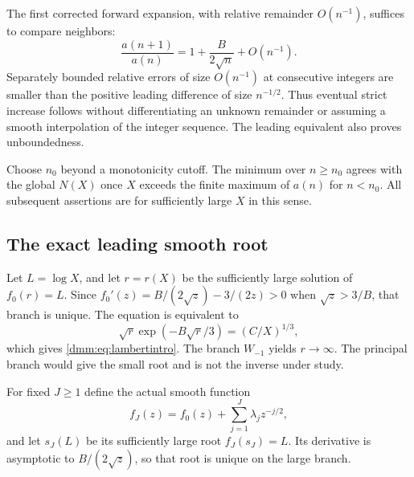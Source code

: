 \documentclass[11pt,letterpaper]{article}
\numberwithin{equation}{section}
\theoremstyle{definition}\newtheorem{definition}[theorem]{Definition}
\theoremstyle{remark}\newtheorem{remark}[theorem]{Remark}
\begin{document}
The first corrected forward expansion, with relative remainder $O(n^{-1})$, suffices to compare neighbors:
\begin{equation}\label{dmm:eq:monotone}
\frac{a(n+1)}{a(n)}=1+\frac B{2\sqrt n}+O(n^{-1}).
\end{equation}
Separately bounded relative errors of size $O(n^{-1})$ at consecutive integers are smaller than the positive leading difference of size $n^{-1/2}$. Thus eventual strict increase follows without differentiating an unknown remainder or assuming a smooth interpolation of the integer sequence. The leading equivalent also proves unboundedness.

Choose $n_0$ beyond a monotonicity cutoff. The minimum over $n\ge n_0$ agrees with the global $N(X)$ once $X$ exceeds the finite maximum of $a(n)$ for $n<n_0$. All subsequent assertions are for sufficiently large $X$ in this sense.

\subsection{The exact leading smooth root}
Let $L=\log X$, and let $r=r(X)$ be the sufficiently large solution of $f_0(r)=L$. Since
$f_0'(z)=B/(2\sqrt z)-3/(2z)>0$ when $\sqrt z>3/B$, that branch is unique. The equation is equivalent to
\[
\sqrt r\exp(-B\sqrt r/3)=(C/X)^{1/3},
\]
which gives \eqref{dmm:eq:lambertintro}. The branch $W_{-1}$ yields $r\to\infty$. The principal branch would give the small root and is not the inverse under study.

For fixed $J\ge1$ define the actual smooth function
\begin{equation}\label{dmm:eq:fJ}
f_J(z)=f_0(z)+\sum_{j=1}^{J}\lambda_jz^{-j/2},
\end{equation}
and let $s_J(L)$ be its sufficiently large root $f_J(s_J)=L$. Its derivative is asymptotic to $B/(2\sqrt z)$, so that root is unique on the large branch.
\end{document}

